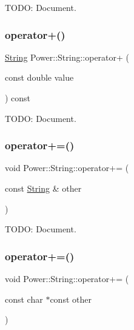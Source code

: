 T\+O\+DO\+: Document. 

\mbox{\label{class_power_1_1_string_a0957d2856d8e5693a49fef4812629459}} 
\subsubsection{\texorpdfstring{operator+()}{operator+()}\hspace{0.1cm}{\footnotesize\ttfamily [11/11]}}
{\footnotesize\ttfamily \hyperlink{class_power_1_1_string}{String} Power\+::\+String\+::operator+ (\begin{DoxyParamCaption}\item[{const double}]{value }\end{DoxyParamCaption}) const\hspace{0.3cm}{\ttfamily [inline]}}



T\+O\+DO\+: Document. 

\mbox{\label{class_power_1_1_string_aad7a34466104387cc33cafcf04770b39}} 
\subsubsection{\texorpdfstring{operator+=()}{operator+=()}\hspace{0.1cm}{\footnotesize\ttfamily [1/11]}}
{\footnotesize\ttfamily void Power\+::\+String\+::operator+= (\begin{DoxyParamCaption}\item[{const \hyperlink{class_power_1_1_string}{String} \&}]{other }\end{DoxyParamCaption})\hspace{0.3cm}{\ttfamily [inline]}}



T\+O\+DO\+: Document. 

\mbox{\label{class_power_1_1_string_a49e4abf34ef85a8d709aa0b6e37a283e}} 
\subsubsection{\texorpdfstring{operator+=()}{operator+=()}\hspace{0.1cm}{\footnotesize\ttfamily [2/11]}}
{\footnotesize\ttfamily void Power\+::\+String\+::operator+= (\begin{DoxyParamCaption}\item[{const char $\ast$const}]{other }\end{DoxyParamCaption})\hspace{0.3cm}{\ttfamily [inline]}}



